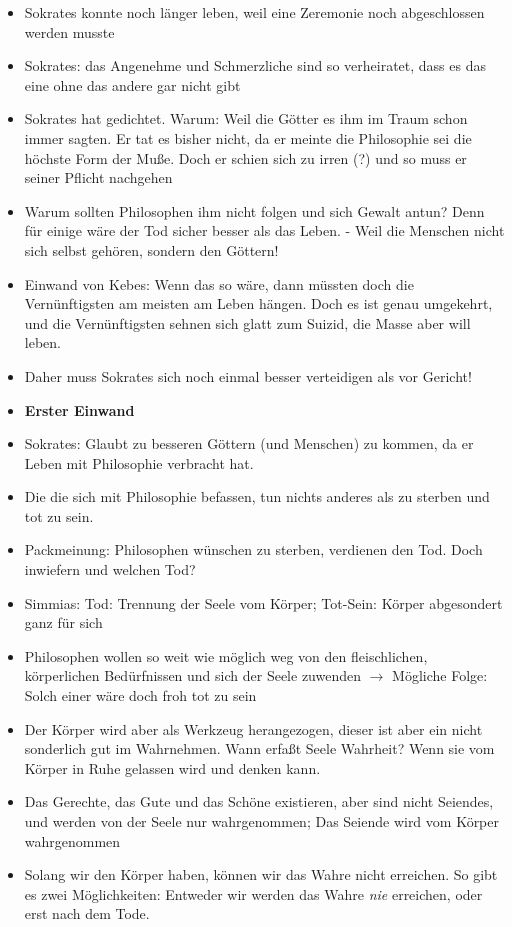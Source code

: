 \documentclass[emulatestandardclasses]{scrartcl}
\begin{document}
\begin{itemize}
  \item Sokrates konnte noch länger leben, weil eine Zeremonie noch abgeschlossen werden musste
  \item Sokrates: das Angenehme und Schmerzliche sind so verheiratet, dass es das eine ohne das andere gar nicht gibt
  \item Sokrates hat gedichtet. Warum: Weil die Götter es ihm im Traum schon immer sagten. Er tat es bisher nicht, da er meinte die Philosophie sei die höchste Form der Muße. Doch er schien sich zu irren (?) und so muss er seiner Pflicht nachgehen
  \item Warum sollten Philosophen ihm nicht folgen und sich Gewalt antun? Denn für einige wäre der Tod sicher besser als das Leben. - Weil die Menschen nicht sich selbst gehören, sondern den Göttern!
  \item Einwand von Kebes: Wenn das so wäre, dann müssten doch die Vernünftigsten am meisten am Leben hängen. Doch es ist genau umgekehrt, und die Vernünftigsten sehnen sich glatt zum Suizid, die Masse aber will leben.
  \item Daher muss Sokrates sich noch einmal besser verteidigen als vor Gericht!
  \item \textbf{Erster Einwand}
  \item Sokrates: Glaubt zu besseren Göttern (und Menschen) zu kommen, da er Leben mit Philosophie verbracht hat.
  \item Die die sich mit Philosophie befassen, tun nichts anderes als zu sterben und tot zu sein.
  \item Packmeinung: Philosophen wünschen zu sterben, verdienen den Tod. Doch inwiefern und welchen Tod? 
  \item Simmias: Tod: Trennung der Seele vom Körper; Tot-Sein: Körper abgesondert ganz für sich
  \item Philosophen wollen so weit wie möglich weg von den fleischlichen, körperlichen Bedürfnissen und sich der Seele zuwenden $\rightarrow$ Mögliche Folge: Solch einer wäre doch froh tot zu sein
  \item Der Körper wird aber als Werkzeug herangezogen, dieser ist aber ein nicht sonderlich gut im Wahrnehmen. Wann erfaßt Seele Wahrheit? Wenn sie vom Körper in Ruhe gelassen wird und denken kann.
  \item Das Gerechte, das Gute und das Schöne existieren, aber sind nicht Seiendes, und werden von der Seele nur wahrgenommen; Das Seiende wird vom Körper wahrgenommen
  \item Solang wir den Körper haben, können wir das Wahre nicht erreichen. So gibt es zwei Möglichkeiten: Entweder wir werden das Wahre \emph{nie} erreichen, oder erst nach dem Tode.

\end{itemize}
\end{document}
